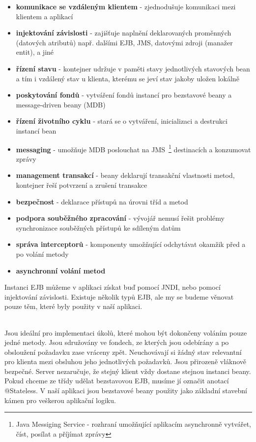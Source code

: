 \documentclass[122pt,oneside]{fithesis}
\begin{document}
\begin{itemize}
  \item {\bf komunikace se vzdáleným klientem} - zjednodušuje komunikaci mezi klientem a aplikací
  \item {\bf injektování závislosti} - zajišťuje naplnění deklarovaných proměnných (datových atributů) např. dalšími EJB, JMS, datovými zdroji (manažer entit), a jiné
  \item {\bf řízení stavu} - kontejner udržuje v paměti stavy jednotlivých stavových bean a tím i vzdálený stav u klienta, kterému se jeví stav jakoby uložen lokálně
  \item {\bf poskytování fondů} - vytváření fondů instancí pro bezstavové beany a message-driven beany (MDB)
  \item {\bf řízení životního cyklu} - stará se o vytváření, inicializaci a destrukci instancí bean
  \item {\bf messaging} - umožňuje MDB poslouchat na JMS~\footnote{Java Messiging Service - rozhraní umožňující aplikacím asynchronně vytvářet, číst, posílat a příjímat zprávy} destinacích a konzumovat zprávy
  \item {\bf management transakcí} - beany deklarují transakční vlastnosti metod, kontejner řeší potvrzení a zrušení transakce
  \item {\bf bezpečnost} - deklarace přístupů na úrovni tříd a metod
  \item {\bf podpora souběžného zpracování} - vývojář nemusí řešit problémy synchronizace souběžných přístupů ke sdíleným datům
  \item {\bf správa interceptorů} - komponenty umožňující odchytávat okamžik před a po volání metody
  \item {\bf asynchronní volání metod} 
\end{itemize}

Instanci EJB můžeme v aplikaci získat buď pomocí JNDI, nebo pomocí injektování závislosti.
Existuje několik typů EJB, ale my se budeme věnovat pouze těm, které byly použity v naší aplikaci.

\vspace{5 mm}
\\\indent Jsou ideální pro implementaci úkolů, které mohou být dokončeny voláním pouze jedné metody. Jsou sdružovány ve fondech, ze kterých jsou odebírány a po obsloužení požadavku zase vráceny zpět. Neuchovávají si žádný stav relevantní pro klienta mezi obsluhou jeho jednotlivých požadavků. Jsou přirozeně vláknově bezpečné. Server nezaručuje, že stejný klient vždy dostane stejnou instanci beany. Pokud chceme ze třídy udělat bezstavovou EJB, musíme jí označit anotací @Stateless. V naší aplikaci jsou bezstavové beany použity jako základní stavební kámen pro veškerou aplikační logiku.
\end{document}
